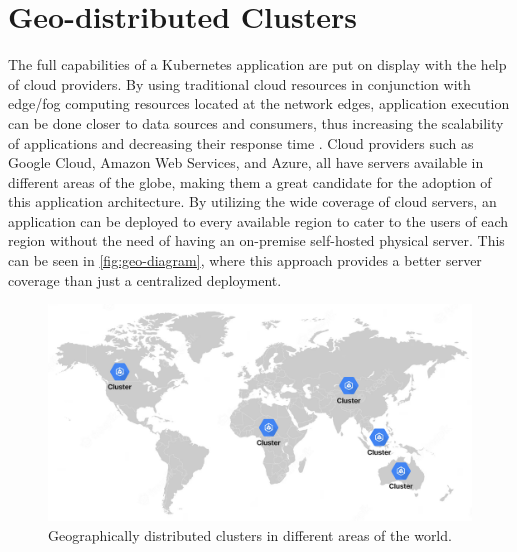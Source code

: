 
\section{Geo-distributed Clusters}
\label{sec:geo-distirbutedCluster}
The full capabilities of a Kubernetes application are put on display with the help of cloud providers. By using traditional cloud resources in conjunction with edge/fog computing resources located at the network edges, application execution can be done closer to data sources and consumers, thus increasing the scalability of applications and decreasing their response time \citep{rossi-2020}. Cloud providers such as Google Cloud, Amazon Web Services, and Azure, all have servers available in different areas of the globe, making them a great candidate for the adoption of this application architecture. By utilizing the wide coverage of cloud servers, an application can be deployed to every available region to cater to the users of each region without the need of having an on-premise self-hosted physical server. This can be seen in \autoref{fig:geo-diagram}, where this approach provides a better server coverage than just a centralized deployment.

\begin{figure}
	\centering
	\includegraphics[width=1\textwidth]{assets/diagrams/geo-diagram.png}
	\caption{Geographically distributed clusters in different areas of the world.}
	\label{fig:geo-diagram}
\end{figure}

